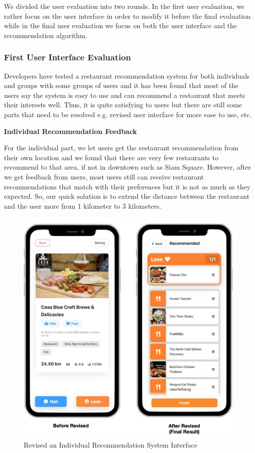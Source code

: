 \documentclass[12pt,oneside,openright,a4paper]{cpe-english-project}
\begin{document}
We divided the user evaluation into two rounds. In the first user evaluation, we rather focus on the user interface in order to modify it before the final evaluation while in the final user evaluation we focus on both the user interface and the recommendation algorithm.

\subsubsection{First User Interface Evaluation}

Developers have tested a restaurant recommendation system for both individuals and groups with some groups of users and it has been found that most of the users say the system is easy to use and can recommend a restaurant that meets their interests well. Thus, it is quite satisfying to users but there are still some parts that need to be resolved e.g. revised user interface for more ease to use, etc.

\textbf{Individual Recommendation Feedback}\par

For the individual part, we let users get the restaurant recommendation from their own location and we found that there are very few restaurants to recommend to that area, if not in downtown such as Siam Square. However, after we get feedback from users, most users still can receive restaurant recommendations that match with their preferences but it is not as much as they expected. So, our quick solution is to extend the distance between the restaurant and the user more from 1 kilometer to 3 kilometers.

\begin{figure}[H]\centering
\includegraphics[width=350pt]{./images/4usereva1.jpg}
\caption{Revised an Individual Recommendation System Interface}
\label{fig:4usereva_1}
\end{figure}\vspace{-24pt}
\end{document}
